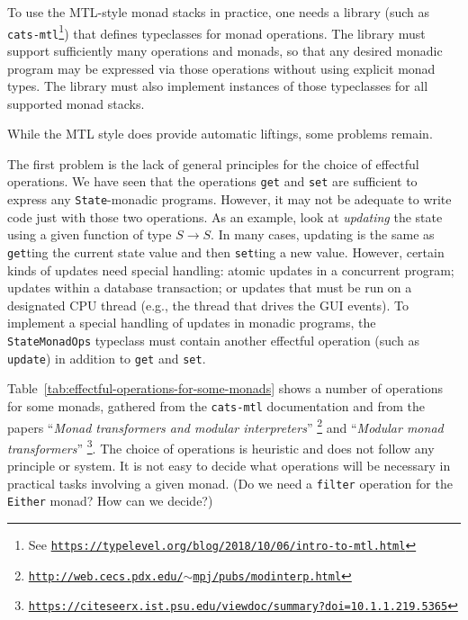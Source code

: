 To use the MTL-style monad stacks in practice, one needs a library
(such as \texttt{cats-mtl}\footnote{See \texttt{\href{https://typelevel.org/blog/2018/10/06/intro-to-mtl.html}{https://typelevel.org/blog/2018/10/06/intro-to-mtl.html}}})
that defines typeclasses for monad operations. The library must support
sufficiently many operations and monads, so that any desired monadic
program may be expressed via those operations without using explicit
monad types. The library must also implement instances of those typeclasses
for all supported monad stacks. 

While the MTL style does provide automatic liftings, some problems
remain. 

The first problem is the lack of general principles for the choice
of effectful operations. We have seen that the operations \lstinline!get!
and \lstinline!set! are sufficient to express any \lstinline!State!-monadic
programs. However, it may not be adequate to write code just with
those two operations. As an example, look at \emph{updating} the state
using a given function of type $S\rightarrow S$. In many cases, updating
is the same as \lstinline!get!ting the current state value and then
\lstinline!set!ting a new value. However, certain kinds of updates
need special handling: atomic updates in a concurrent program; updates
within a database transaction; or updates that must be run on a designated
CPU thread (e.g., the thread that drives the GUI events). To implement
a special handling of updates in monadic programs, the \lstinline!StateMonadOps!
typeclass must contain another effectful operation (such as \lstinline!update!)
in addition to \lstinline!get! and \lstinline!set!.

Table~\ref{tab:effectful-operations-for-some-monads} shows a number
of operations for some monads, gathered from the \texttt{cats-mtl}
documentation and from the papers \textsf{``}\emph{Monad transformers and
modular interpreters}\textsf{''} \footnote{\texttt{\href{http://web.cecs.pdx.edu/~mpj/pubs/modinterp.html}{http://web.cecs.pdx.edu/$\sim$mpj/pubs/modinterp.html}}}
and \textsf{``}\emph{Modular monad transformers}\textsf{''} \footnote{\texttt{\href{https://citeseerx.ist.psu.edu/viewdoc/summary?doi=10.1.1.219.5365}{https://citeseerx.ist.psu.edu/viewdoc/summary?doi=10.1.1.219.5365}}}.
The choice of operations is heuristic and does not follow any principle
or system. It is not easy to decide what operations will be necessary
in practical tasks involving a given monad. (Do we need a \lstinline!filter!
operation for the \lstinline!Either! monad? How can we decide?)

